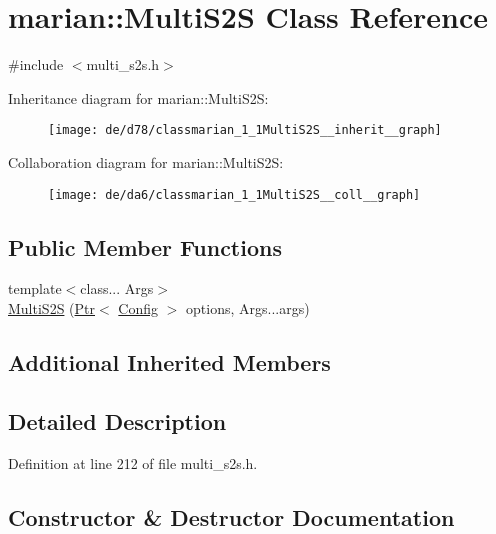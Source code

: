 \hypertarget{classmarian_1_1MultiS2S}{}\section{marian\+:\+:Multi\+S2S Class Reference}
\label{classmarian_1_1MultiS2S}


{\ttfamily \#include $<$multi\+\_\+s2s.\+h$>$}



Inheritance diagram for marian\+:\+:Multi\+S2S\+:
\nopagebreak
\begin{figure}[H]
\begin{center}
\leavevmode
\texttt{[image: de/d78/classmarian\_1\_1MultiS2S\_\_inherit\_\_graph]}
\end{center}
\end{figure}


Collaboration diagram for marian\+:\+:Multi\+S2S\+:
\nopagebreak
\begin{figure}[H]
\begin{center}
\leavevmode
\texttt{[image: de/da6/classmarian\_1\_1MultiS2S\_\_coll\_\_graph]}
\end{center}
\end{figure}
\subsection*{Public Member Functions}
\begin{DoxyCompactItemize}
\item 
{\footnotesize template$<$class... Args$>$ }\\\hyperlink{classmarian_1_1MultiS2S_ac4beeeeb151cc8da4b238826faa2079a}{Multi\+S2S} (\hyperlink{namespacemarian_ad1a373be43a00ef9ce35666145137b08}{Ptr}$<$ \hyperlink{classmarian_1_1Config}{Config} $>$ options, Args...\+args)
\end{DoxyCompactItemize}
\subsection*{Additional Inherited Members}


\subsection{Detailed Description}


Definition at line 212 of file multi\+\_\+s2s.\+h.



\subsection{Constructor \& Destructor Documentation}
